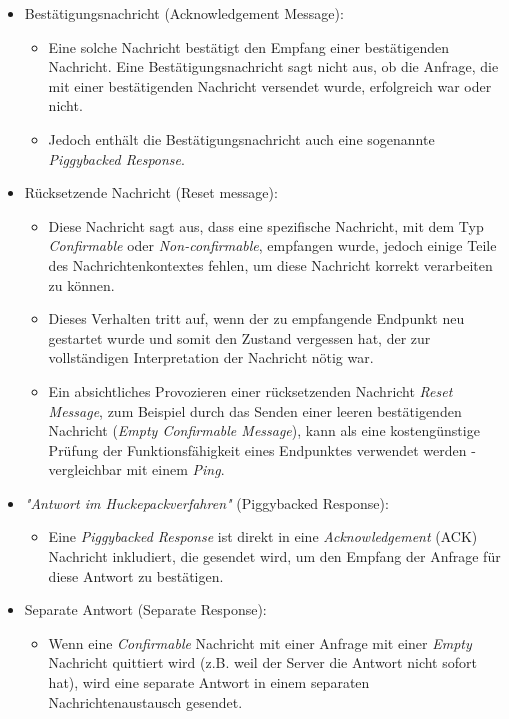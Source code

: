 \begin{itemize}
\begin{itemize}
          \end{itemize}
    \item Bestätigungsnachricht (Acknowledgement Message):
          \begin{itemize}
              \item Eine solche Nachricht bestätigt den Empfang einer bestätigenden Nachricht. Eine Bestätigungsnachricht sagt nicht aus, ob die Anfrage, die mit einer bestätigenden Nachricht versendet wurde, erfolgreich war oder nicht.
              \item Jedoch enthält die Bestätigungsnachricht auch eine sogenannte \textit{Piggybacked Response}.
          \end{itemize}
    \item Rücksetzende Nachricht (Reset message):
          \begin{itemize}
              \item Diese Nachricht sagt aus, dass eine spezifische Nachricht, mit dem Typ \textit{Confirmable} oder \textit{Non-confirmable}, empfangen wurde, jedoch einige Teile des Nachrichtenkontextes fehlen, um diese Nachricht korrekt verarbeiten zu können.
              \item Dieses Verhalten tritt auf, wenn der zu empfangende Endpunkt neu gestartet wurde und somit den Zustand vergessen hat, der zur vollständigen Interpretation der Nachricht nötig war.
              \item Ein absichtliches Provozieren einer rücksetzenden Nachricht \textit{Reset Message}, zum Beispiel durch das Senden einer leeren bestätigenden Nachricht (\textit{Empty Confirmable Message}), kann als eine kostengünstige Prüfung der Funktionsfähigkeit eines Endpunktes verwendet werden - vergleichbar mit einem \textit{Ping}.
          \end{itemize}
    \item \textit{"Antwort im Huckepackverfahren"} (Piggybacked Response):
          \begin{itemize}
              \item Eine \textit{Piggybacked Response} ist direkt in eine \textit{Acknowledgement} (ACK) Nachricht inkludiert, die gesendet wird, um den Empfang der Anfrage für diese Antwort zu bestätigen.
          \end{itemize}
    \item Separate Antwort (Separate Response):
          \begin{itemize}
              \item Wenn eine \textit{Confirmable} Nachricht mit einer Anfrage mit einer \textit{Empty} Nachricht quittiert wird (z.B. weil der Server die Antwort nicht sofort hat), wird eine separate Antwort in einem separaten Nachrichtenaustausch gesendet.

\end{itemize}
\end{itemize}
